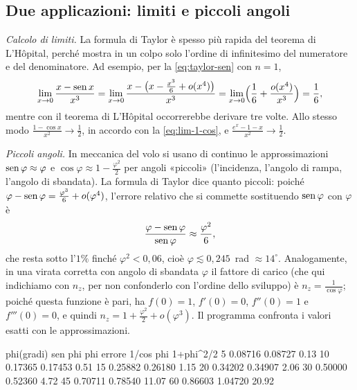 \subsection{Due applicazioni: limiti e piccoli angoli}

\emph{Calcolo di limiti.} La formula di Taylor è spesso più rapida del teorema di
L'Hôpital, perché mostra in un colpo solo l'ordine di infinitesimo del numeratore e del
denominatore. Ad esempio, per la \eqref{eq:taylor-sen} con $n=1$,
\[
  \lim_{x\to0}\frac{x-\operatorname{sen} x}{x^{3}}=\lim_{x\to0}\frac{x-\bigl(x-\frac{x^{3}}6+o(x^{4})\bigr)}{x^{3}}
  =\lim_{x\to0}\Bigl(\frac16+\frac{o(x^{4})}{x^{3}}\Bigr)=\frac16 ,
\]
mentre con il teorema di L'Hôpital occorrerebbe derivare tre volte. Allo stesso modo
$\frac{1-\cos x}{x^{2}}\to\frac12$, in accordo con la \eqref{eq:lim-1-cos}, e
$\frac{e^{x}-1-x}{x^{2}}\to\frac12$.

\emph{Piccoli angoli.} In meccanica del volo si usano di continuo le approssimazioni
$\operatorname{sen}\varphi\approx\varphi$ e $\cos\varphi\approx1-\frac{\varphi^{2}}2$ per angoli
«piccoli» (l'incidenza, l'angolo di rampa, l'angolo di sbandata). La formula di Taylor
dice quanto piccoli: poiché $\varphi-\operatorname{sen}\varphi=\frac{\varphi^{3}}6+o(\varphi^{4})$,
l'errore relativo che si commette sostituendo $\operatorname{sen}\varphi$ con $\varphi$ è
\[
  \frac{\varphi-\operatorname{sen}\varphi}{\operatorname{sen}\varphi}\approx\frac{\varphi^{2}}{6},
\]
che resta sotto l'$1\%$ finché $\varphi^{2}<0{,}06$, cioè $\varphi\lesssim0{,}245$~rad
$\approx14^{\circ}$. Analogamente, in una virata corretta con angolo di sbandata
$\varphi$ il fattore di carico (che qui indichiamo con $n_{z}$, per non confonderlo con
l'ordine dello sviluppo) è $n_{z}=\frac1{\cos\varphi}$; poiché questa funzione è pari,
ha $f(0)=1$, $f'(0)=0$, $f''(0)=1$ e $f'''(0)=0$, e quindi
$n_{z}=1+\frac{\varphi^{2}}2+o(\varphi^{3})$. Il programma confronta i valori esatti con le
approssimazioni.

\begin{risultato}
 phi(gradi)  sen phi    phi    errore   1/cos phi  1+phi^2/2
       5    0.08716  0.08727    0.13%
      10    0.17365  0.17453    0.51%
      15    0.25882  0.26180    1.15%
      20    0.34202  0.34907    2.06%
      30    0.50000  0.52360    4.72%
      45    0.70711  0.78540   11.07%
      60    0.86603  1.04720   20.92%
\end{risultato}

